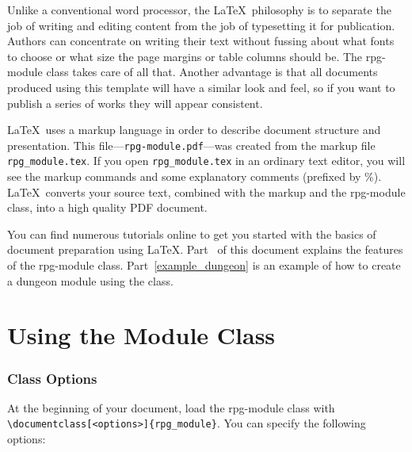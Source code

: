 \documentclass[a4paper,serif]{rpg-module}
\begin{document}
Unlike a conventional word processor, the \LaTeX~philosophy is to separate the job of writing and editing content
from the job of typesetting it for publication. Authors can concentrate on writing their text without fussing
about what fonts to choose or what size the page margins or table columns should be. The rpg-module class takes care
of all that. Another advantage is that all documents produced using this template will have a similar look and
feel, so if you want to publish a series of works they will appear consistent.

\LaTeX~uses a markup language in order to describe document structure and presentation. This
file---\verb|rpg-module.pdf|---was created from the markup file \verb|rpg_module.tex|. If you open \verb|rpg_module.tex|
in an ordinary text editor, you will see the markup commands and some explanatory comments (prefixed by \%).
\LaTeX~converts your source text, combined with the markup and the rpg-module class, into a high quality PDF document.

You can find numerous tutorials online to get you started with the basics of document preparation using \LaTeX.
Part~\ref{using_the_module_class} of this document explains the features of the rpg-module class. Part~\ref{example_dungeon}
is an example of how to create a dungeon module using the class.

\part{Using the Module Class}
\label{using_the_module_class}

\section{Class Options}

At the beginning of your document, load the rpg-module class with \verb|\documentclass[<options>]{rpg_module}|. You can
specify the following options:
\end{document}
